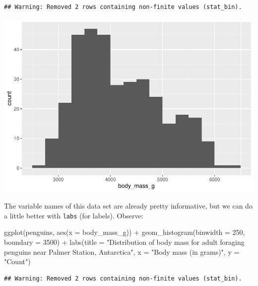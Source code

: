 \documentclass[
]{book}
\newenvironment{Shaded}{\begin{snugshade}}{\end{snugshade}}
\newcommand{\AttributeTok}[1]{\textcolor[rgb]{0.77,0.63,0.00}{#1}}
\newcommand{\DecValTok}[1]{\textcolor[rgb]{0.00,0.00,0.81}{#1}}
\newcommand{\FunctionTok}[1]{\textcolor[rgb]{0.00,0.00,0.00}{#1}}
\newcommand{\NormalTok}[1]{#1}
\newcommand{\SpecialCharTok}[1]{\textcolor[rgb]{0.00,0.00,0.00}{#1}}
\newcommand{\StringTok}[1]{\textcolor[rgb]{0.31,0.60,0.02}{#1}}
\begin{document}
\begin{verbatim}
## Warning: Removed 2 rows containing non-finite values (stat_bin).
\end{verbatim}

\includegraphics{intro_stats_files/figure-latex/unnamed-chunk-112-1.pdf}

The variable names of this data set are already pretty informative, but we can do a little better with \texttt{labs} (for labels). Observe:

\begin{Shaded}
\begin{Highlighting}[]
\FunctionTok{ggplot}\NormalTok{(penguins, }\FunctionTok{aes}\NormalTok{(}\AttributeTok{x =}\NormalTok{ body\_mass\_g)) }\SpecialCharTok{+}
    \FunctionTok{geom\_histogram}\NormalTok{(}\AttributeTok{binwidth =} \DecValTok{250}\NormalTok{, }\AttributeTok{boundary =} \DecValTok{3500}\NormalTok{) }\SpecialCharTok{+}
    \FunctionTok{labs}\NormalTok{(}\AttributeTok{title =} \StringTok{"Distribution of body mass for adult foraging penguins near}
\StringTok{         Palmer Station, Antarctica"}\NormalTok{,}
         \AttributeTok{x =} \StringTok{"Body mass (in grams)"}\NormalTok{,}
         \AttributeTok{y =} \StringTok{"Count"}\NormalTok{)}
\end{Highlighting}
\end{Shaded}

\begin{verbatim}
## Warning: Removed 2 rows containing non-finite values (stat_bin).
\end{verbatim}
\end{document}
